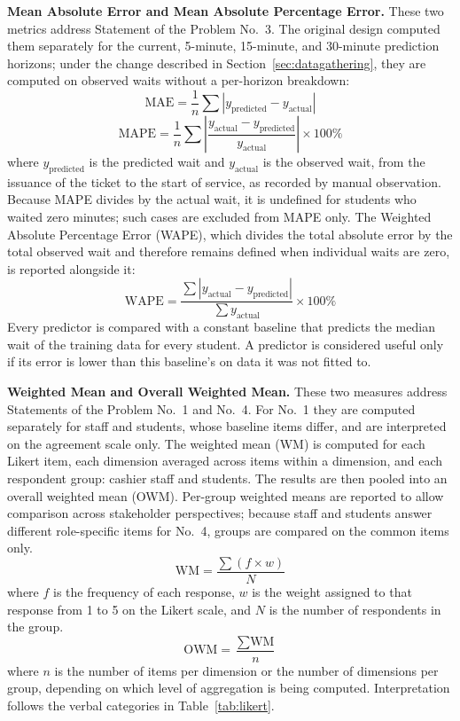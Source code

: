 \documentclass{research}
\begin{document}
\textbf{Mean Absolute Error and Mean Absolute Percentage Error.} These
two metrics address Statement of the Problem No.~3. The original design
computed them separately for the current, 5-minute, 15-minute, and
30-minute prediction horizons; under the change described in
Section~\ref{sec:datagathering}, they are computed on observed waits
without a per-horizon breakdown:
\begin{equation}
  \text{MAE} =
  \frac{1}{n}\sum |y_{\text{predicted}} - y_{\text{actual}}|
  \label{eq:mae}
\end{equation}
\begin{equation}
  \text{MAPE} = \frac{1}{n}\sum\left|
    \frac{y_{\text{actual}} - y_{\text{predicted}}}{y_{\text{actual}}}
  \right| \times 100\%
  \label{eq:mape}
\end{equation}
where $y_{\text{predicted}}$ is the predicted wait and
$y_{\text{actual}}$ is the observed wait, from the issuance of the
ticket to the start of service, as recorded by manual observation.
Because MAPE divides by the actual wait, it is undefined for students
who waited zero minutes; such cases are excluded from MAPE only. The
Weighted Absolute Percentage Error (WAPE), which divides the total
absolute error by the total observed wait and therefore remains defined
when individual waits are zero, is reported alongside it:
\begin{equation}
  \text{WAPE} =
  \frac{\sum |y_{\text{actual}} - y_{\text{predicted}}|}
       {\sum y_{\text{actual}}} \times 100\%
  \label{eq:wape}
\end{equation}
Every predictor is compared with a constant baseline that predicts the
median wait of the training data for every student. A predictor is
considered useful only if its error is lower than this baseline's on
data it was not fitted to.

\textbf{Weighted Mean and Overall Weighted Mean.} These two measures
address Statements of the Problem No.~1 and No.~4. For No.~1 they are
computed separately for staff and students, whose baseline items
differ, and are interpreted on the agreement scale only. The weighted
mean (WM) is
computed for each Likert item, each dimension averaged across items
within a dimension, and each respondent group: cashier staff and
students. The results are then pooled into an
overall weighted mean (OWM). Per-group weighted means are reported to
allow comparison across stakeholder perspectives; because staff and
students answer different role-specific items for No.~4, groups are
compared on the common items only.
\begin{equation}
  \text{WM} = \frac{\sum(f \times w)}{N}
  \label{eq:weighted_mean}
\end{equation}
where $f$ is the frequency of each response, $w$ is the weight assigned
to that response from 1 to 5 on the Likert scale, and $N$ is the number
of respondents in the group.
\begin{equation}
  \text{OWM} = \frac{\sum \text{WM}}{n}
  \label{eq:overall_weighted_mean}
\end{equation}
where $n$ is the number of items per dimension or the number of
dimensions per group, depending on which level of aggregation is being
computed. Interpretation follows the verbal categories in
Table~\ref{tab:likert}.
\end{document}
